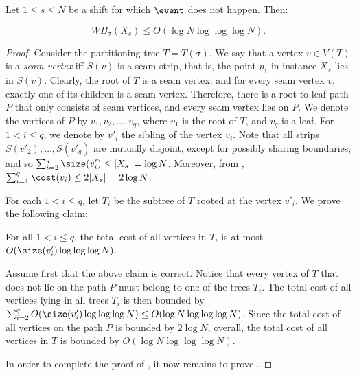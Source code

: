 \documentclass{toc}
\begin{document}
\begin{lemma}\label{lem: no bad event low cost}
	Let $1\leq s\leq N$ be a shift for which $\event$ does not happen. Then:
	
	 $$WB_{\sigma}(X_s)\leq O(\log N\log\log\log N).$$
\end{lemma}

\begin{proof}
	Consider the partitioning tree $T=T(\sigma)$. 
We say that a vertex $v\in V(T)$ is a \emph{seam vertex} iff $S(v)$ is a seam strip, that is, the point $p_1$ in instance $X_s$ lies in $S(v)$.  
Clearly, the root of $T$ is a seam vertex, and for every seam vertex $v$, exactly one of its children is a seam vertex. 
Therefore, there is a root-to-leaf path $P$ that only consists of seam vertices, and every seam vertex lies on $P$. 
We denote the vertices of $P$ by $v_1,v_2,\ldots,v_q$, where $v_1$ is the root of $T$, and $v_q$ is a leaf. 
For $1<i\leq q$, we denote by $v'_i$ the sibling of the vertex $v_i$. 
Note that all strips $S(v'_2),\ldots,S(v'_q)$ are mutually disjoint, except for possibly sharing boundaries, and so $\sum_{i=2}^q\size(v'_i)\leq |X_s|= \log N$. 
Moreover, from , $\sum_{i=1}^q\cost(v_i)\leq 2|X_s|=2\log N$.
	
For each $1<i\leq q$, let $T_i$ be the subtree of $T$ rooted at the vertex $v'_i$. We prove the following claim:
	
	\begin{claim}\label{claim: bounding subtrees}
		For all $1<i\leq q$, the total cost of all vertices in $T_i$ is at most $O(\size(v'_i)\log\log\log N)$.
	\end{claim}
	
	Assume first that the above claim is correct. Notice that every vertex of $T$ that does not lie on the path $P$ must belong to one of the trees $T_i$. 
The total cost of all vertices lying in all trees $T_i$ is then bounded by $\sum_{i=2}^qO(\size(v'_i)\log\log\log N)\leq O(\log N\log\log\log N)$. 
Since the total cost of all vertices on the path $P$ is bounded by $2\log N$, overall, the total cost of all vertices in $T$ is bounded by $O(\log N\log\log\log N)$.


In order to complete the proof of , it now remains to prove .


\end{proof}
\end{document}
